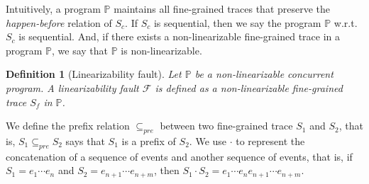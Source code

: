 \documentclass[runningheads]{llncs}
\newcommand{\p}{\mathbb{P} }
\newcommand{\ct}{S_c}
\newtheorem{myDef}{Definition}
\begin{document}
Intuitively, a program $\mathbb{P}$ maintains all %
fine-grained traces that preserve the \textit{happen-before} relation of $S_c$.
If $S_c$ is sequential, then we say the program $\p$ w.r.t. $\ct$ is sequential.
And, if there exists a non-linearizable fine-grained trace in a program $\p$, we say that $\p$ is non-linearizable.

\begin{myDef}[Linearizability fault]
Let $\p$ be a non-linearizable concurrent program. A \textit{linearizability fault} $\mathcal{F}$ is defined as a non-linearizable fine-grained trace $S_f$ in $\p$.
\end{myDef}

We define the prefix relation $\subseteq_{pre}$ between two fine-grained trace $S_1$ and $S_2$, that is, $S_1\subseteq_{pre} S_2$ says that $S_1$ is a prefix of $S_2$. We use $\cdot$ to represent the concatenation of a sequence of events and another sequence of events, that is, if $S_1=e_1\cdots e_n$ and $S_2 = e_{n+1}\cdots e_{n+m}$, then $S_1\cdot S_2 = e_1\cdots e_n e_{n+1}\cdots e_{n+m}$.
\end{document}
